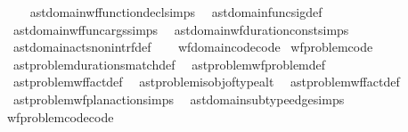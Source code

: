 \begin{isabellebody}
\ \ \isanewline
\ \ ast{\isacharunderscore}{\kern0pt}domain{\isachardot}{\kern0pt}wf{\isacharunderscore}{\kern0pt}function{\isacharunderscore}{\kern0pt}decl{\isachardot}{\kern0pt}simps\isanewline
\ \ ast{\isacharunderscore}{\kern0pt}domain{\isachardot}{\kern0pt}func{\isacharunderscore}{\kern0pt}sig{\isacharunderscore}{\kern0pt}def\isanewline
\ \ ast{\isacharunderscore}{\kern0pt}domain{\isachardot}{\kern0pt}wf{\isacharunderscore}{\kern0pt}func{\isacharunderscore}{\kern0pt}args{\isacharprime}{\kern0pt}{\isachardot}{\kern0pt}simps\isanewline
\ \ ast{\isacharunderscore}{\kern0pt}domain{\isachardot}{\kern0pt}wf{\isacharunderscore}{\kern0pt}duration{\isacharunderscore}{\kern0pt}const{\isacharprime}{\kern0pt}{\isachardot}{\kern0pt}simps\isanewline
\ \ ast{\isacharunderscore}{\kern0pt}domain{\isachardot}{\kern0pt}acts{\isacharunderscore}{\kern0pt}non{\isacharunderscore}{\kern0pt}intrf{\isacharunderscore}{\kern0pt}def\isanewline
\ \ \isanewline
\isanewline
{}\isamarkupfalse%
\ wf{\isacharunderscore}{\kern0pt}domain{\isacharunderscore}{\kern0pt}code{\isacharbrackleft}{\kern0pt}code{\isacharbrackright}{\kern0pt}\isanewline
\isanewline
{}\isamarkupfalse%
\ wf{\isacharunderscore}{\kern0pt}problem{\isacharunderscore}{\kern0pt}code\ {\isacharequal}{\kern0pt}\isanewline
\ \ ast{\isacharunderscore}{\kern0pt}problem{\isachardot}{\kern0pt}durations{\isacharunderscore}{\kern0pt}match{\isacharprime}{\kern0pt}{\isacharunderscore}{\kern0pt}def\isanewline
\ \ ast{\isacharunderscore}{\kern0pt}problem{\isachardot}{\kern0pt}wf{\isacharunderscore}{\kern0pt}problem{\isacharprime}{\kern0pt}{\isacharunderscore}{\kern0pt}def\isanewline
\ \ ast{\isacharunderscore}{\kern0pt}problem{\isachardot}{\kern0pt}wf{\isacharunderscore}{\kern0pt}fact{\isacharprime}{\kern0pt}{\isacharunderscore}{\kern0pt}def\isanewline
\ \ ast{\isacharunderscore}{\kern0pt}problem{\isachardot}{\kern0pt}is{\isacharunderscore}{\kern0pt}obj{\isacharunderscore}{\kern0pt}of{\isacharunderscore}{\kern0pt}type{\isacharunderscore}{\kern0pt}alt\isanewline
\ \ ast{\isacharunderscore}{\kern0pt}problem{\isachardot}{\kern0pt}wf{\isacharunderscore}{\kern0pt}fact{\isacharunderscore}{\kern0pt}def\isanewline
\ \ ast{\isacharunderscore}{\kern0pt}problem{\isachardot}{\kern0pt}wf{\isacharunderscore}{\kern0pt}plan{\isacharunderscore}{\kern0pt}action{\isachardot}{\kern0pt}simps\isanewline
\ \ ast{\isacharunderscore}{\kern0pt}domain{\isachardot}{\kern0pt}subtype{\isacharunderscore}{\kern0pt}edge{\isachardot}{\kern0pt}simps\isanewline
\isanewline
{}\isamarkupfalse%
\ wf{\isacharunderscore}{\kern0pt}problem{\isacharunderscore}{\kern0pt}code{\isacharbrackleft}{\kern0pt}code{\isacharbrackright}{\kern0pt}\isanewline

\end{isabellebody}
